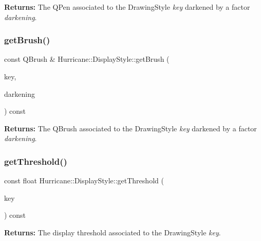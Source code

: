 {\bfseries Returns\+:} The Q\+Pen associated to the Drawing\+Style {\itshape key} darkened by a factor {\itshape darkening}. \mbox{\label{classHurricane_1_1DisplayStyle_ad2f4f9eb2323888cab0fbc8ea5433777}} 
\subsubsection{\texorpdfstring{get\+Brush()}{getBrush()}}
{\footnotesize\ttfamily const Q\+Brush \& Hurricane\+::\+Display\+Style\+::get\+Brush (\begin{DoxyParamCaption}\item[{const \textbf{ Name} \&}]{key,  }\item[{const H\+S\+Vr \&}]{darkening }\end{DoxyParamCaption}) const}

{\bfseries Returns\+:} The Q\+Brush associated to the Drawing\+Style {\itshape key} darkened by a factor {\itshape darkening}. \mbox{\label{classHurricane_1_1DisplayStyle_ac4a7a7bfede6747aad9980fd7f375b8d}} 
\subsubsection{\texorpdfstring{get\+Threshold()}{getThreshold()}}
{\footnotesize\ttfamily const float Hurricane\+::\+Display\+Style\+::get\+Threshold (\begin{DoxyParamCaption}\item[{const \textbf{ Name} \&}]{key }\end{DoxyParamCaption}) const}

{\bfseries Returns\+:} The display threshold associated to the Drawing\+Style {\itshape key}. \mbox{\label{classHurricane_1_1DisplayStyle_ad85904fb9c823e5f0193461a5e4f9a1a}} 
